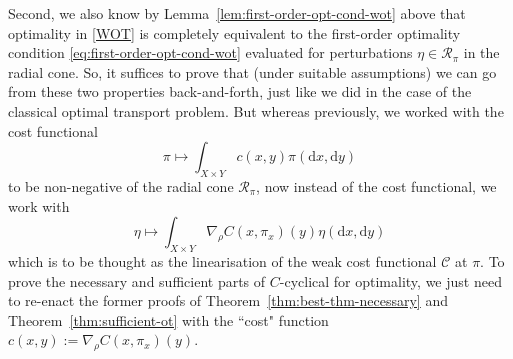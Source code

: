 \documentclass[leqno, 11pt, a4paper]{amsart}
\theoremstyle{definition}
\newcommand{\cR}{\mathcal{R}}
\newcommand{\C}{\mathscr{C}}
\newcommand{\dd}{\mathrm{d}}
\begin{document}
Second, we also know by Lemma~\ref{lem:first-order-opt-cond-wot} above that optimality in \eqref{WOT} is completely equivalent to the first-order optimality condition \eqref{eq:first-order-opt-cond-wot} evaluated for perturbations $\eta \in \cR_\pi$ in the radial cone. So, it suffices to prove that (under suitable assumptions) we can go from these two properties back-and-forth, just like we did in the case of the classical optimal transport problem. But whereas previously, we worked with the cost functional $$\pi \mapsto \int_{X \times Y} c(x,y)  \pi(\dd x, \dd y)$$ to be non-negative of the radial cone $\cR_\pi$, now instead of the cost functional, we work with $$\eta \mapsto \int_{X \times Y} \nabla_\rho C(x, \pi_x)(y)  \eta(\dd x, \dd y)$$
which is to be thought as the linearisation of the weak cost functional $\C$ at $\pi$. To prove the necessary and sufficient parts of $C$-cyclical for optimality, we just need to re-enact the former proofs of Theorem~\ref{thm:best-thm-necessary} and Theorem~\ref{thm:sufficient-ot} with the ``cost" function $c(x, y) := \nabla_\rho C(x, \pi_x)(y)$.
\end{document}
